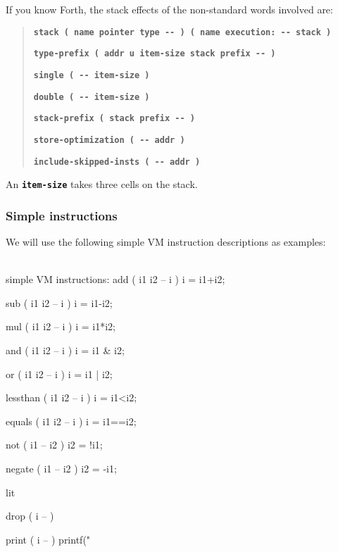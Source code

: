 \documentclass[10pt,english]{article}
\begin{document}
If you know Forth, the stack effects of the non-standard words involved
are:
\begin{quotation}
\texttt{\textbf{stack ( \textquotedbl{}name\textquotedbl{} \textquotedbl{}pointer\textquotedbl{}
\textquotedbl{}type\textquotedbl{} -{}- ) ( name execution: -{}- stack
)}}

\texttt{\textbf{type-prefix ( addr u item-size stack \textquotedbl{}prefix\textquotedbl{}
-{}- )}}

\texttt{\textbf{single ( -{}- item-size )}}

\texttt{\textbf{double ( -{}- item-size )}}

\texttt{\textbf{stack-prefix ( stack \textquotedbl{}prefix\textquotedbl{}
-{}- )}}

\texttt{\textbf{store-optimization ( -{}- addr )}}

\texttt{\textbf{include-skipped-insts ( -{}- addr )}}
\end{quotation}
An \texttt{\textbf{item-size}} takes three cells on the stack.


\subsubsection{Simple instructions}

We will use the following simple VM instruction descriptions as examples:

\nwenddocs{}\endmoddef
\\ simple VM instructions:
add ( i1 i2 -- i )
i = i1+i2;

sub ( i1 i2 -- i )
i = i1-i2;

mul ( i1 i2 -- i )
i = i1*i2;

and ( i1 i2 -- i )
i = i1 & i2;

or ( i1 i2 -- i )
i = i1 | i2;

lessthan ( i1 i2 -- i )
i = i1<i2;

equals ( i1 i2 -- i )
i = i1==i2;

not ( i1 -- i2 )
i2 = !i1;

negate ( i1 -- i2 )
i2 = -i1;

\LA{}lit~{\nwtagstyle{}}\RA{}

drop ( i -- )

print ( i -- )
printf("%
\nwendcode{}\nwdocspar
\end{document}
